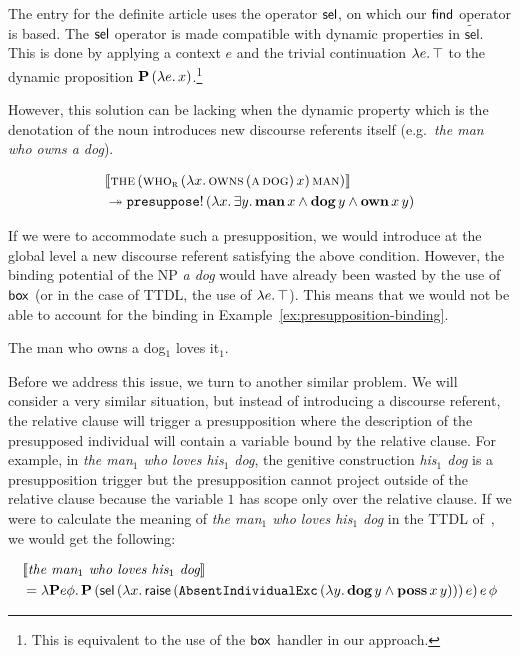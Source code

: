 The entry for the definite article uses the operator $\mathsf{sel}$, on which our
$\mathsf{find}$ operator is based. The $\mathsf{sel}$ operator is made compatible with
dynamic properties in $\widetilde{\textsf{sel}}$. This is done by applying
a context $e$ and the trivial continuation $\lambda e.\, \top$ to the dynamic
proposition $\textbf{P}\,(\lambda e.\, x)$.\footnote{This is equivalent to
  the use of the $\mathsf{box}$ handler in our approach.}

However, this solution can be lacking when the dynamic property which is
the denotation of the noun introduces new discourse referents itself (e.g.\
\emph{the man who owns a dog}).

\begin{align*}
& \llbracket \textsc{the}\,(\textsc{who}_{\textsc{r}}\,(\lambda x.\, \textsc{owns}\,(\textsc{a}\,\textsc{dog})\,x)\,\textsc{man}) \rrbracket \\
& \twoheadrightarrow \mathtt{presuppose}!\,(\lambda x.\, \exists y.\, \textbf{man}\,x \land
  \textbf{dog}\,y \land \textbf{own}\,x\,y)
\end{align*}

If we were to accommodate such a presupposition, we would introduce at the
global level a new discourse referent satisfying the above
condition. However, the binding potential of the NP \emph{a dog} would have
already been wasted by the use of $\mathsf{box}$ (or in the case of TTDL, the use
of $\lambda e.\, \top$). This means that we would not be able to account for
the binding in Example~\ref{ex:presupposition-binding}.

\begin{exe}
  \ex The man who owns a dog$_1$ loves it$_1$. \label{ex:presupposition-binding}
\end{exe}

Before we address this issue, we turn to another similar problem. We will
consider a very similar situation, but instead of introducing a discourse
referent, the relative clause will trigger a presupposition where the
description of the presupposed individual will contain a variable bound by
the relative clause. For example, in \emph{the man$_1$ who loves his$_1$
  dog}, the genitive construction \emph{his$_1$ dog} is a presupposition
trigger but the presupposition cannot project outside of the relative
clause because the variable $1$ has scope only over the relative clause. If
we were to calculate the meaning of \emph{the man$_1$ who loves his$_1$
  dog} in the TTDL of~\cite{lebedeva2012expression}, we would get the
following:

\begin{align*}
& \llbracket \textit{the man$_1$ who loves his$_1$ dog} \rrbracket \\
& = \lambda \textbf{P} e \phi.\, \textbf{P}\,(\textsf{sel}\,(\lambda x.\, \textsf{raise}\,(\texttt{AbsentIndividualExc}\,(\lambda y.\, \textbf{dog}\,y \land \textbf{poss}\,x\,y)))\,e)\,e\,\phi
\end{align*}

